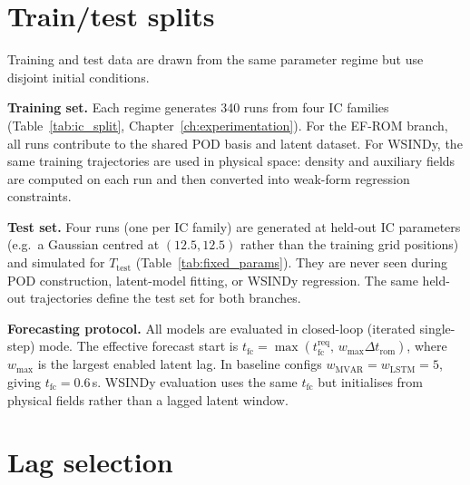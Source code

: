 \section{Train/test splits}
\label{sec:splits}

Training and test data are drawn from the same parameter regime but use
disjoint initial conditions.

\noindent\textbf{Training set.}
Each regime generates 340 runs from four IC families
(Table~\ref{tab:ic_split}, Chapter~\ref{ch:experimentation}).
For the EF-ROM branch, all runs contribute to the shared POD basis and latent
dataset.  For WSINDy, the same training trajectories are used in physical
space: density and auxiliary fields are computed on each run and then
converted into weak-form regression constraints.

\noindent\textbf{Test set.}
Four runs (one per IC family) are generated at held-out IC parameters
(e.g.\ a Gaussian centred at $(12.5,12.5)$ rather than the training grid
positions) and simulated for $T_{\mathrm{test}}$ (Table~\ref{tab:fixed_params}).
They are never seen during POD construction, latent-model fitting, or WSINDy
regression.  The same held-out trajectories define the test set for both
branches.

\noindent\textbf{Forecasting protocol.}
All models are evaluated in closed-loop (iterated single-step) mode.
The effective forecast start is
$t_{\mathrm{fc}} = \max(t_{\mathrm{fc}}^{\mathrm{req}},\, w_{\max}\Delta t_{\mathrm{rom}})$,
where $w_{\max}$ is the largest enabled latent lag.
In baseline configs $w_{\mathrm{MVAR}}=w_{\mathrm{LSTM}}=5$, giving
$t_{\mathrm{fc}}=0.6$\,s.
WSINDy evaluation uses the same $t_{\mathrm{fc}}$ but initialises from
physical fields rather than a lagged latent window.

\section{Lag selection}
\label{sec:lag_selection}

